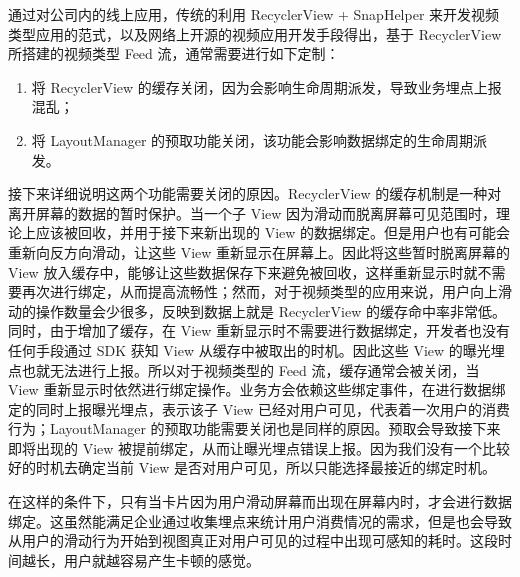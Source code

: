 通过对公司内的线上应用，传统的利用 RecyclerView + SnapHelper 来开发视频类型应用的范式，以及网络上开源的视频应用开发手段得出，基于 RecyclerView 所搭建的视频类型 Feed 流，通常需要进行如下定制：

\begin{enumerate}
    \item 将 RecyclerView 的缓存关闭，因为会影响生命周期派发，导致业务埋点上报混乱；
    \item 将 LayoutManager 的预取功能关闭，该功能会影响数据绑定的生命周期派发。
\end{enumerate}

接下来详细说明这两个功能需要关闭的原因。RecyclerView 的缓存机制是一种对离开屏幕的数据的暂时保护。当一个子 View 因为滑动而脱离屏幕可见范围时，理论上应该被回收，并用于接下来新出现的 View 的数据绑定。但是用户也有可能会重新向反方向滑动，让这些 View 重新显示在屏幕上。因此将这些暂时脱离屏幕的 View 放入缓存中，能够让这些数据保存下来避免被回收，这样重新显示时就不需要再次进行绑定，从而提高流畅性；然而，对于视频类型的应用来说，用户向上滑动的操作数量会少很多，反映到数据上就是 RecyclerView 的缓存命中率非常低。同时，由于增加了缓存，在 View 重新显示时不需要进行数据绑定，开发者也没有任何手段通过 SDK 获知 View 从缓存中被取出的时机。因此这些 View 的曝光埋点也就无法进行上报。所以对于视频类型的 Feed 流，缓存通常会被关闭，当 View 重新显示时依然进行绑定操作。业务方会依赖这些绑定事件，在进行数据绑定的同时上报曝光埋点，表示该子 View 已经对用户可见，代表着一次用户的消费行为；LayoutManager 的预取功能需要关闭也是同样的原因。预取会导致接下来即将出现的 View 被提前绑定，从而让曝光埋点错误上报。因为我们没有一个比较好的时机去确定当前 View 是否对用户可见，所以只能选择最接近的绑定时机。

在这样的条件下，只有当卡片因为用户滑动屏幕而出现在屏幕内时，才会进行数据绑定。这虽然能满足企业通过收集埋点来统计用户消费情况的需求，但是也会导致从用户的滑动行为开始到视图真正对用户可见的过程中出现可感知的耗时。这段时间越长，用户就越容易产生卡顿的感觉。